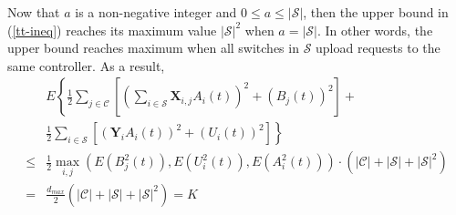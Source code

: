 \documentclass[10pt,journal,compsoc]{IEEEtran}
\begin{document}
Now that $a$ is a non-negative integer and $0 \le a \le |\mathcal{S}|$, then the upper bound in (\ref{tt-ineq}) reaches its maximum value $|\mathcal{S}|^2$ when $a = |\mathcal{S}|$. In other words, the upper bound reaches maximum when all switches in $\mathcal{S}$ upload requests to the same controller. 
As a result, 
\begin{equation}\label{k-upper}
	\begin{array}{cl}
		& \displaystyle E \left\{ 
			\frac{1}{2} \sum_{j \in \mathcal{C}} \left[ \left( \sum_{i \in \mathcal{S}} \mathbf{X}_{i,j} A_i(t) \right)^2  + \left( B_j(t) \right)^2 \right] + \right. \\
		& \displaystyle \left. \frac{1}{2} \sum_{i \in \mathcal{S}} \left[ \left( \mathbf{Y}_{i} A_i(t) \right)^2  + \left( U_i(t) \right)^2 \right] \right\} \\
		\le & \displaystyle \frac{1}{2} \max_{i,j} (E(B_j^2(t)), E(U_i^2(t)), E(A_i^2(t))) \cdot \left( |\mathcal{C}| + |\mathcal{S}| + |\mathcal{S}|^2 \right) \\
		= & \displaystyle \frac{d_{max}}{2} \left( |\mathcal{C}| + |\mathcal{S}| + |\mathcal{S}|^2 \right) = K \\
	\end{array}
\end{equation}
\end{document}
